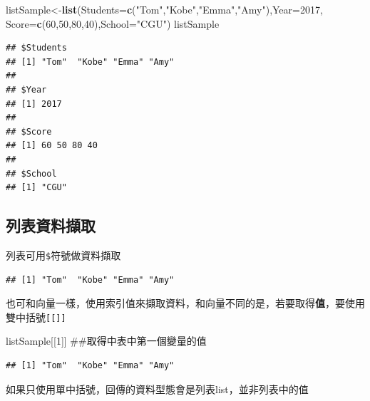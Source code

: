 \documentclass[]{book}
\newenvironment{Shaded}{\begin{snugshade}}{\end{snugshade}}
\newcommand{\KeywordTok}[1]{\textcolor[rgb]{0.13,0.29,0.53}{\textbf{{#1}}}}
\newcommand{\DataTypeTok}[1]{\textcolor[rgb]{0.13,0.29,0.53}{{#1}}}
\newcommand{\DecValTok}[1]{\textcolor[rgb]{0.00,0.00,0.81}{{#1}}}
\newcommand{\StringTok}[1]{\textcolor[rgb]{0.31,0.60,0.02}{{#1}}}
\newcommand{\NormalTok}[1]{{#1}}
\theoremstyle{definition}
\theoremstyle{definition}
\theoremstyle{remark}
\begin{document}
\begin{Shaded}
\begin{Highlighting}[]
\NormalTok{listSample<-}\KeywordTok{list}\NormalTok{(}\DataTypeTok{Students=}\KeywordTok{c}\NormalTok{(}\StringTok{"Tom"}\NormalTok{,}\StringTok{"Kobe"}\NormalTok{,}\StringTok{"Emma"}\NormalTok{,}\StringTok{"Amy"}\NormalTok{),}\DataTypeTok{Year=}\DecValTok{2017}\NormalTok{,}
                 \DataTypeTok{Score=}\KeywordTok{c}\NormalTok{(}\DecValTok{60}\NormalTok{,}\DecValTok{50}\NormalTok{,}\DecValTok{80}\NormalTok{,}\DecValTok{40}\NormalTok{),}\DataTypeTok{School=}\StringTok{"CGU"}\NormalTok{)}
\NormalTok{listSample}
\end{Highlighting}
\end{Shaded}

\begin{verbatim}
## $Students
## [1] "Tom"  "Kobe" "Emma" "Amy" 
## 
## $Year
## [1] 2017
## 
## $Score
## [1] 60 50 80 40
## 
## $School
## [1] "CGU"
\end{verbatim}

\subsection{列表資料擷取}

列表可用\texttt{\$}符號做資料擷取

\begin{Shaded}
\end{Shaded}

\begin{verbatim}
## [1] "Tom"  "Kobe" "Emma" "Amy"
\end{verbatim}

也可和向量一樣，使用索引值來擷取資料，和向量不同的是，若要取得\textbf{值}，要使用雙中括號\texttt{{[}{[}{]}{]}}

\begin{Shaded}
\begin{Highlighting}[]
\NormalTok{listSample[[}\DecValTok{1}\NormalTok{]] ##取得中表中第一個變量的值}
\end{Highlighting}
\end{Shaded}

\begin{verbatim}
## [1] "Tom"  "Kobe" "Emma" "Amy"
\end{verbatim}

如果只使用單中括號，回傳的資料型態會是列表list，並非列表中的值
\end{document}
